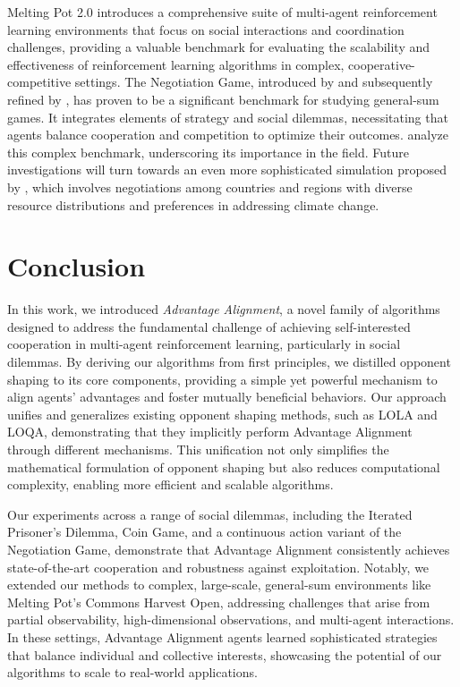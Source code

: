\documentclass{article} \usepackage{iclr2025_conference,times}
\begin{document}
Melting Pot 2.0 \citep{agapiou2023meltingpot20} introduces a comprehensive suite of multi-agent reinforcement learning environments that focus on social interactions and coordination challenges, providing a valuable benchmark for evaluating the scalability and effectiveness of reinforcement learning algorithms in complex, cooperative-competitive settings. The Negotiation Game, introduced by \cite{DeVault2015TowardNT, lewis2017deal} and subsequently refined by \cite{cao2018emergent}, has proven to be a significant benchmark for studying general-sum games. It integrates elements of strategy and social dilemmas, necessitating that agents balance cooperation and competition to optimize their outcomes. \cite{DBLP:conf/atal/NoukhovitchLLC21} analyze this complex benchmark, underscoring its importance in the field. Future investigations will turn towards an even more sophisticated simulation proposed by \cite{zhang2022ai}, which involves negotiations among countries and regions with diverse resource distributions and preferences in addressing climate change. 

\section{Conclusion}
\label{conclusion}
In this work, we introduced \textit{Advantage Alignment}, a novel family of algorithms designed to address the fundamental challenge of achieving self-interested cooperation in multi-agent reinforcement learning, particularly in social dilemmas. By deriving our algorithms from first principles, we distilled opponent shaping to its core components, providing a simple yet powerful mechanism to align agents' advantages and foster mutually beneficial behaviors. Our approach unifies and generalizes existing opponent shaping methods, such as LOLA and LOQA, demonstrating that they implicitly perform Advantage Alignment through different mechanisms. This unification not only simplifies the mathematical formulation of opponent shaping but also reduces computational complexity, enabling more efficient and scalable algorithms.

Our experiments across a range of social dilemmas, including the Iterated Prisoner's Dilemma, Coin Game, and a continuous action variant of the Negotiation Game, demonstrate that Advantage Alignment consistently achieves state-of-the-art cooperation and robustness against exploitation. Notably, we extended our methods to complex, large-scale, general-sum environments like Melting Pot's Commons Harvest Open, addressing challenges that arise from partial observability, high-dimensional observations, and multi-agent interactions. In these settings, Advantage Alignment agents learned sophisticated strategies that balance individual and collective interests, showcasing the potential of our algorithms to scale to real-world applications.
\end{document}
